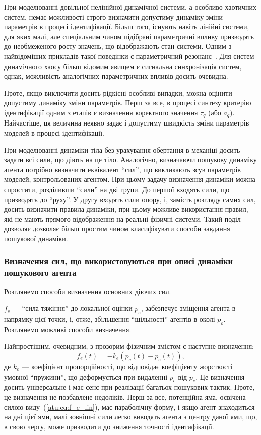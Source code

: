 При моделюванні довільної нелінійної динамічної системи,
а особливо хаотичних систем, немає можливості строго
визначити допустиму динаміку зміни параметрів в процесі
ідентифікації. Більш того, існують навіть лінійні системи, для
яких малі, але спеціальним чином підібрані параметричні впливу
призводять до необмеженого росту значень, що відображають
стан системи. Одним з найвідоміших прикладів такої поведінки є
параметричний резонанс~\cite{landau1}. Для систем динамічного хаосу
більш відомим явищем є сигнальна синхронізація систем, однак,
можливість аналогічних параметричних впливів досить очевидна.

Проте, якщо виключити досить рідкісні особливі випадки, можна
оцінити допустиму динаміку зміни параметрів. Перш за все,
в процесі синтезу критерію ідентифікації одним з етапів є
визначення коректного значення
$\tau_q$ (або $a_q$).
Найчастіше, ця величина неявно задає і допустиму
швидкість зміни параметрів моделей в процесі ідентифікації.

При моделюванні динаміки тіла без урахування обертання в механіці досить задати
всі сили, що діють на це тіло. Аналогічно, визначаючи пошукову динаміку агента
потрібно визначити еквівалент ``сил'', що викликають зсув параметрів моделей,
контрольованих агентом. При цьому задачу визначення динаміки можна спростити,
розділивши ``сили'' на дві групи. До першої входять сили, що призводять до ``руху''.
У другу входять сили опору, і, замість розгляду самих сил, досить
визначити правила динаміки, при цьому можливе використання правил, які не мають
прямого відображення на реальні фізичні системи.
Такий поділ дозволяє дозволяє більш простим чином класифікувати
способи завдання пошукової динаміки.


\subsubsection{Визначення сил, що використовуються при описі динаміки пошукового агента} %

Розглянемо способи визначення основних діючих сил.

$f_e$ ---
``сила тяжіння'' до локальної оцінки $p_e$, забезпечує зміщення
агента в напрямку цієї точки, і, отже, збільшення ``щільності'' агентів в
околі $p_o$.
Розглянемо можливі способи визначення.

Найпростішим, очевидним, з прозорим фізичним змістом є
наступне визначення:
%
\begin{equation}
  f_e(t) = - k_e \left( p_c(t) - p_e(t) \right)  ,
  \label{atu:eq:f_e_lin}
\end{equation}
%
де $k_e$ --- коефіцієнт пропорційності, що відповідає коефіцієнту жорсткості
умовної ``пружини'', що деформується при видаленні $p_c$ від $p_e$. Це
визначення досить універсальне і має сенс при реалізації багатьох пошукових
тактик.
%
Проте, це визначення не позбавлене недоліків. Перш за все,
потенційна яма, освічена силою виду~(\ref{atu:eq:f_e_lin}), має параболічну
форму, і якщо агент знаходиться на дні цієї ями, малі зовнішні
сили легко виводять агента з центру даної ями, що, в свою чергу,
може призводити до зниження точності ідентифікації.

